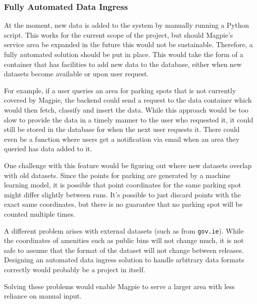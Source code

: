 \newpage{}

\subsubsection{Fully Automated Data Ingress}
At the moment, new data is added to the system by manually running a Python
script. This works for the current scope of the project, but should Magpie's
service area be expanded in the future this would not be sustainable. Therefore,
a fully automated solution should be put in place. This would take the form of a
container that has facilities to add new data to the database, either when new
datasets become available or upon user request.

For example, if a user queries an area for parking spots that is not currently
covered by Magpie, the backend could send a request to the data container which
would then fetch, classify and insert the data. While this approach would be too
slow to provide the data in a timely manner to the user who requested it, it
could still be stored in the database for when the next user requests it. There
could even be a function where users get a notification via email when an area
they queried has data added to it.

One challenge with this feature would be figuring out where new datasets overlap
with old datasets. Since the points for parking are generated by a machine
learning model, it is possible that point coordinates for the same parking spot
might differ slightly between runs. It's possible to just discard points with
the exact same coordinates, but there is no guarantee that no parking spot will
be counted multiple times.

A different problem arises with external datasets (such as from
\texttt{gov.ie}). While the coordinates of amenities such as public bins will
not change much, it is not safe to assume that the format of the dataset will
not change between releases. Designing an automated data ingress solution to
handle arbitrary data formats correctly would probably be a project in itself.

Solving these problems would enable Magpie to serve a larger area with less
reliance on manual input.

\newpage{}
